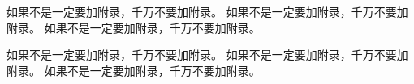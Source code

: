 如果不是一定要加附录，千万不要加附录。
如果不是一定要加附录，千万不要加附录。
如果不是一定要加附录，千万不要加附录。

如果不是一定要加附录，千万不要加附录。
如果不是一定要加附录，千万不要加附录。
如果不是一定要加附录，千万不要加附录。